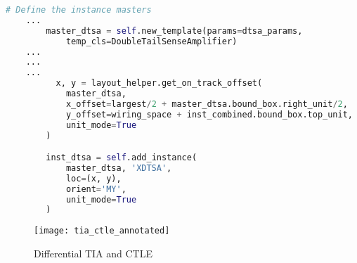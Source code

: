 \begin{lstlisting}[language=Python, caption=Adding and placing templates to a layout, label={lst:master_creation}, float]
# Define the instance masters
	...
        master_dtsa = self.new_template(params=dtsa_params, 
            temp_cls=DoubleTailSenseAmplifier)
	...
	...
	...
	      x, y = layout_helper.get_on_track_offset(
            master_dtsa,
            x_offset=largest/2 + master_dtsa.bound_box.right_unit/2,
            y_offset=wiring_space + inst_combined.bound_box.top_unit,
            unit_mode=True
        )

        inst_dtsa = self.add_instance(
            master_dtsa, 'XDTSA',
            loc=(x, y),
            orient='MY',
            unit_mode=True
        )
\end{lstlisting}
\begin{figure}[h]
\centering
\texttt{[image: tia\_ctle\_annotated]}
\caption{Differential TIA and CTLE}
\label{fig:tia_ctle}
\end{figure}

